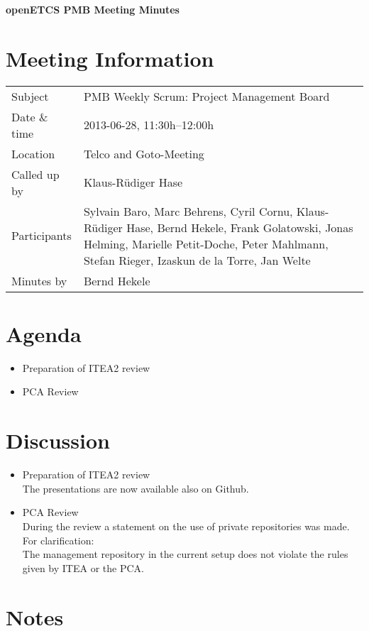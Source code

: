 \documentclass[a4paper, 11pt]{article}
\begin{document}
{\begin{center}\huge\bf openETCS PMB Meeting Minutes\end{center}}
\section{Meeting Information}

\renewcommand{\arraystretch}{1.5}
\begin{supertabular}{m{.2\textwidth}m{.8\textwidth}}
Subject & PMB Weekly Scrum: Project Management Board\\
Date \& time & 2013-06-28, 11:30h--12:00h\\
Location & Telco and Goto-Meeting\\
Called up by & Klaus-R\"udiger Hase\\
Participants &
Sylvain Baro,
Marc Behrens,
Cyril Cornu,
Klaus-R\"udiger Hase,
Bernd Hekele,
Frank Golatowski,
Jonas Helming,
Marielle Petit-Doche,
Peter Mahlmann,
Stefan Rieger,
Izaskun de la Torre,
Jan Welte
\\

Minutes by & Bernd Hekele\\

\end{supertabular}
\renewcommand{\arraystretch}{1.0}


\section{{Agenda}}
\begin{itemize}
\item Preparation of ITEA2 review\\
\item PCA Review\\
\end{itemize}

\section{Discussion}
\begin{itemize}
\item Preparation of ITEA2 review\\
The presentations are now available also on Github.
\item PCA Review\\
During the review a statement on the use of private repositories was made. For clarification:\\
The management repository in the current setup does not violate the rules given by ITEA or the PCA.\\

\end{itemize}

\section{Notes}
\end{document}
